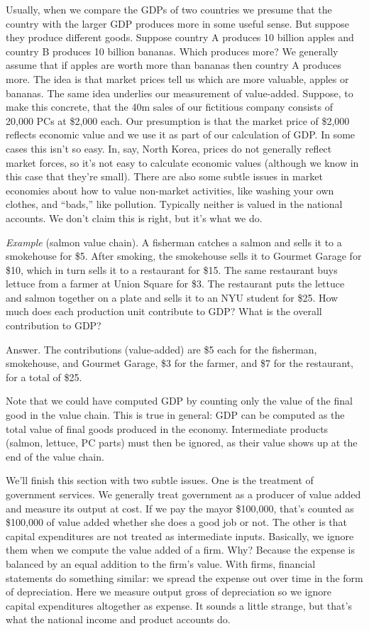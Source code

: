 \documentclass[12pt,letterpaper]{article}
\begin{document}
Usually, when we compare the GDPs of two countries we presume
that the country with the larger GDP produces more in some
useful sense. But suppose they produce different goods. Suppose
country A produces 10 billion apples and country B produces 10
billion bananas.  Which produces more? We generally assume that if
apples are worth more than bananas then country A produces more.
The idea is that market prices tell us which are more valuable,
apples or bananas. The same idea underlies our measurement of
value-added. Suppose, to make this concrete, that the 40m sales of
our fictitious company consists of 20,000 PCs at \$2,000 each. Our
presumption is that the market price of \$2,000 reflects economic
value and we use it as part of our calculation of GDP. In some
cases this isn't so easy. In, say, North Korea, prices do not
generally reflect market forces, so it's not easy to calculate
economic values (although we know in this case that they're
small). There are also some subtle issues in market economies
about how to value non-market activities, like 
washing your own clothes, and ``bads,'' like pollution. 
Typically neither is valued in the national accounts.
We don't claim this is right, but it's what we do.

{\it Example\/} (salmon value chain). A fisherman catches a salmon
and sells it to a smokehouse for \$5. After smoking, the
smokehouse sells it to Gourmet Garage for \$10, which in turn
sells it to a restaurant for \$15. The same restaurant buys
lettuce from a farmer at Union Square for \$3. The restaurant puts
the lettuce and salmon together on a plate and sells it to an NYU
student for \$25. How much does each production unit contribute to
GDP? What is the overall contribution to GDP?

Answer. The contributions (value-added) are \$5 each for the
fisherman, smokehouse, and Gourmet Garage, \$3 for the farmer, and
\$7 for the restaurant, for a total of \$25.

Note that we could
have computed GDP by counting only the value of the final good
in the value chain. This is true in general: GDP can be
computed as the total value of final goods produced in the
economy. Intermediate products (salmon, lettuce, PC parts) must
then be ignored, as their value shows up at the end of the value
chain.

We'll finish this section with two subtle issues.  
One is the treatment of government services.
We generally treat government as a producer of value added 
and measure its output at cost.  
If we pay the mayor \$100,000, that's counted as \$100,000 
of value added whether she does a good job or not.  
The other is that capital expenditures are not treated as
intermediate inputs.
Basically, we ignore them when we compute the value added of a firm.
Why? Because the expense is balanced
by an equal addition to the firm's value.
With firms, financial statements do something similar:
we spread the expense out over time in the form of depreciation.
Here we measure output gross of depreciation so we ignore
capital expenditures altogether as expense.
It sounds a little strange, but that's what the national income
and product accounts do.
\end{document}
